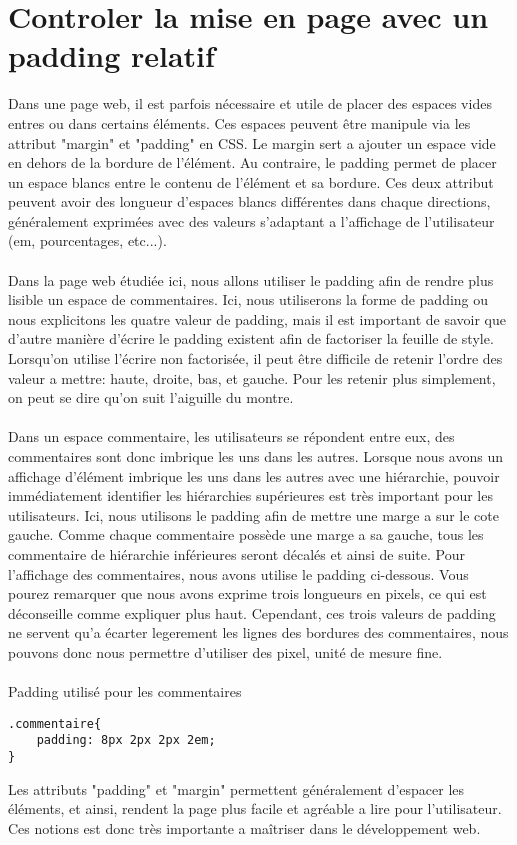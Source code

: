 \section{Controler la mise en page avec un padding relatif}
Dans une page web, il est parfois nécessaire et utile de placer des espaces vides entres ou dans certains éléments. Ces espaces peuvent être manipule via les attribut "margin" et "padding" en CSS. Le margin sert a ajouter un espace vide en dehors de la bordure de l’élément. Au contraire, le padding permet de placer un espace blancs entre le contenu de l’élément et sa bordure. Ces deux attribut peuvent avoir des longueur d’espaces blancs différentes dans chaque directions, généralement exprimées avec des valeurs s’adaptant a l’affichage de l’utilisateur (em, pourcentages, etc...).
\\\\
Dans la page web étudiée ici, nous allons utiliser le padding afin de rendre plus lisible un espace de commentaires. Ici, nous utiliserons la forme de padding ou nous explicitons les quatre valeur de padding, mais il est important de savoir que d’autre manière d’écrire le padding existent afin de factoriser la feuille de style. Lorsqu’on utilise l’écrire non factorisée, il peut être difficile de retenir l’ordre des valeur a mettre: haute, droite, bas, et gauche. Pour les retenir plus simplement, on peut se dire qu’on suit l’aiguille du montre.
\\\\
Dans un espace commentaire, les utilisateurs se répondent entre eux, des commentaires sont donc imbrique les uns dans les autres. Lorsque nous avons un affichage d’élément imbrique les uns dans les autres avec une hiérarchie, pouvoir immédiatement identifier les hiérarchies supérieures est très important pour les utilisateurs. Ici, nous utilisons le padding afin de mettre une marge a sur le cote gauche. Comme chaque commentaire possède une marge a sa gauche, tous les commentaire de hiérarchie inférieures seront décalés et ainsi de suite. Pour l’affichage des commentaires, nous avons utilise le padding ci-dessous. Vous pourez remarquer que nous avons exprime trois longueurs en pixels, ce qui est déconseille comme expliquer plus haut. Cependant, ces trois valeurs de padding ne servent qu’a écarter legerement les lignes des bordures des commentaires, nous pouvons donc nous permettre d’utiliser des pixel, unité de mesure fine.
\\\\
Padding utilisé pour les commentaires
\begin{verbatim}
.commentaire{
	padding: 8px 2px 2px 2em;
}
\end{verbatim}
Les attributs "padding" et "margin" permettent généralement d’espacer les éléments, et ainsi, rendent la page plus facile et agréable a lire pour l’utilisateur. Ces notions est donc très importante a maîtriser dans le développement web.

